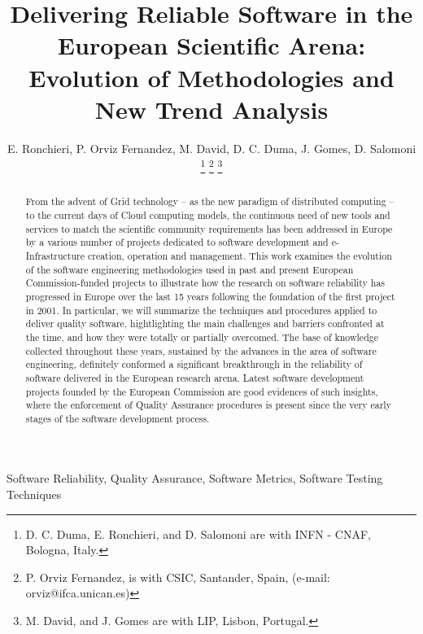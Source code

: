\documentclass[journal]{IEEEtran}
\begin{document}
\title{Delivering Reliable Software in the European Scientific Arena: Evolution of Methodologies and New Trend Analysis}

\author{E. Ronchieri,
        P. Orviz Fernandez,
        M. David,
	D. C. Duma,
        J. Gomes,
        D. Salomoni
\thanks{D. C. Duma, E. Ronchieri, and D. Salomoni are with INFN - CNAF, Bologna, Italy.}
\thanks{P. Orviz Fernandez, is with CSIC, Santander, Spain, (e-mail: orviz@ifca.unican.es)}
\thanks{M. David, and J. Gomes are with LIP, Lisbon, Portugal.}%
}


\maketitle

\begin{abstract}
From the advent of Grid technology -- as the new paradigm of distributed
computing -- to the current days of Cloud computing models, the continuous need
of new tools and services to match the scientific community requirements has been
addressed in Europe by a various number of projects dedicated to software development
and e-Infrastructure creation, operation and management.
This work examines the evolution of the software engineering methodologies used in past and
present European Commission-funded projects to illustrate how the research on software
reliability has progressed in Europe over the last 15 years following the foundation of the
first project in 2001. In particular, we will summarize the techniques and procedures
applied to deliver quality software, hightlighting the main challenges and barriers confronted
at the time, and how they were totally or partially overcomed. The base of knowledge collected
throughout these years, sustained by the advances in the area of software engineering,
definitely conformed a significant breakthrough in the reliability of software delivered in the
European research arena. Latest software development projects founded by the European 
Commission are good evidences of such insights, where the enforcement of Quality Assurance
procedures is present since the very early stages of the software development process.
\end{abstract}

\begin{IEEEkeywords}
Software Reliability, Quality Assurance, Software Metrics, Software Testing
Techniques
\end{IEEEkeywords}
\end{document}
